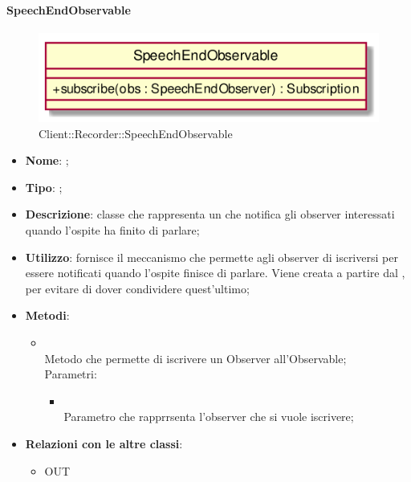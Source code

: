 \hypertarget{SpeechEndObservable_label}{\paragraph{SpeechEndObservable}}
\begin{figure}[h]
	\centering
	\includegraphics[width=\textwidth,height=\textheight,keepaspectratio]{images/ClassSpeechEndObservable.png}
	\caption{Client::Recorder::SpeechEndObservable}
\end{figure}
\begin{itemize}
	\item \textbf{Nome}: ;
	\item \textbf{Tipo}: ;
	\item \textbf{Descrizione}: classe che rappresenta un  che notifica gli observer interessati quando l'ospite ha finito di parlare;
	\item \textbf{Utilizzo}: fornisce il meccanismo che permette agli observer di iscriversi per essere notificati quando l'ospite finisce di parlare. Viene creata a partire dal , per evitare di dover condividere quest'ultimo;
	\item \textbf{Metodi}:
	\begin{itemize}
		\item[]  \\
		Metodo che permette di iscrivere un Observer all'Observable;\\
		Parametri:
		\begin{itemize}
			\item {} \\
			Parametro che rapprrsenta l'observer che si vuole iscrivere;
		\end{itemize}
	\end{itemize}
	\item \textbf{Relazioni con le altre classi}:
	\begin{itemize}
		\item OUT \hyperlink{LogicObserver_label}{}
	\end{itemize}
\end{itemize}
\FloatBarrier


